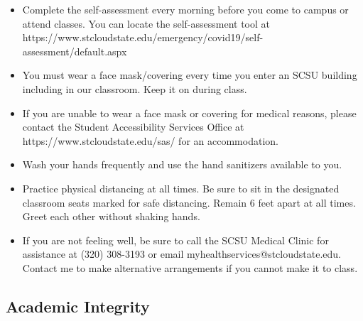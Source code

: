 \documentclass{tufte-handout}
\begin{document}
\begin{fullwidth}
\begin{itemize}
\item Complete the self-assessment every morning before you come to campus or attend classes. You can locate the self-assessment tool at https://www.stcloudstate.edu/emergency/covid19/self-assessment/default.aspx 
\item You must wear a face mask/covering every time you enter an SCSU building including in our classroom. Keep it on during class.
\item If you are unable to wear a face mask or covering for medical reasons, please contact the Student Accessibility Services Office at https://www.stcloudstate.edu/sas/ for an accommodation.
\item Wash your hands frequently and use the hand sanitizers available to you.
\item Practice physical distancing at all times. Be sure to sit in the designated classroom seats marked for safe distancing. Remain 6 feet apart at all times. Greet each other without shaking hands.
\item If you are not feeling well, be sure to call the SCSU Medical Clinic for assistance at (320) 308-3193 or email myhealthservices@stcloudstate.edu. Contact me to make alternative arrangements if you cannot make it to class.
\end{itemize}

\subsection{Academic Integrity}





\end{fullwidth}
\end{document}
